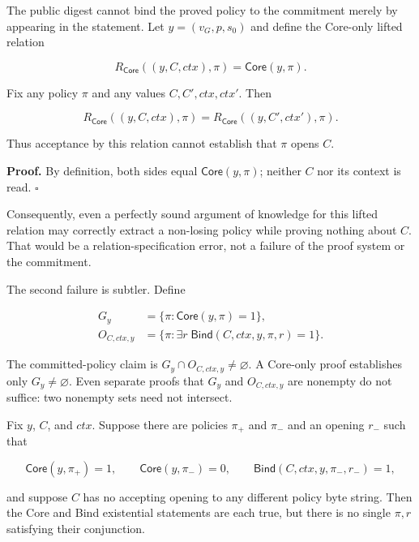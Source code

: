 The public digest cannot bind the proved policy to the commitment merely by
appearing in the statement. Let $y=(v_G,p,s_0)$ and define the Core-only lifted
relation

\[
 R_{\mathsf{Core}}((y,C,\mathit{ctx}),\pi)
   =\mathsf{Core}(y,\pi).
\]

\begin{proposition}
\label{prop:ttt-unused-commitment}
\mbox{}\par
Fix any policy $\pi$ and any values
$C,C',\mathit{ctx},\mathit{ctx}'$. Then

\[
 R_{\mathsf{Core}}((y,C,\mathit{ctx}),\pi)
 =R_{\mathsf{Core}}((y,C',\mathit{ctx}'),\pi).
\]

Thus acceptance by this relation cannot establish that $\pi$ opens $C$.
\end{proposition}

\textbf{Proof.}
By definition, both sides equal $\mathsf{Core}(y,\pi)$; neither $C$ nor its
context is read. $\square$

Consequently, even a perfectly sound argument of knowledge for this lifted
relation may correctly extract a non-losing policy while proving nothing about
$C$. That would be a relation-specification error, not a failure of the proof
system or the commitment.

The second failure is subtler. Define

\[
 \begin{aligned}
 G_y&=\{\pi:\mathsf{Core}(y,\pi)=1\},\\
 O_{C,\mathit{ctx},y}
   &=\{\pi:\exists r\;\mathsf{Bind}(C,\mathit{ctx},y,\pi,r)=1\}.
 \end{aligned}
\]

The committed-policy claim is
$G_y\cap O_{C,\mathit{ctx},y}\ne\varnothing$. A Core-only proof establishes
only $G_y\ne\varnothing$. Even separate proofs that $G_y$ and
$O_{C,\mathit{ctx},y}$ are nonempty do not suffice: two nonempty sets need not
intersect.

\begin{proposition}
\label{prop:ttt-shared-witness}
Fix $y$, $C$, and $\mathit{ctx}$. Suppose there are policies $\pi_+$ and
$\pi_-$ and an opening $r_-$ such that

\[
 \mathsf{Core}(y,\pi_+)=1,\qquad
 \mathsf{Core}(y,\pi_-)=0,\qquad
 \mathsf{Bind}(C,\mathit{ctx},y,\pi_-,r_-)=1,
\]

and suppose $C$ has no accepting opening to any different policy byte string.
Then the Core and Bind existential statements are each true, but there is no
single $\pi,r$ satisfying their conjunction.
\end{proposition}

